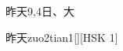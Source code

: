 \begin{entry}{昨天}{9,4}{⽇、⼤}
  \begin{phonetics}{昨天}{zuo2tian1}[][HSK 1]
  \end{phonetics}
\end{entry}
